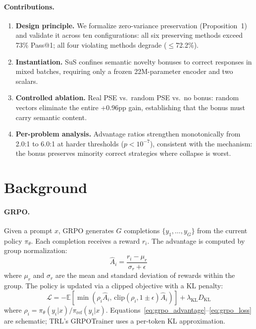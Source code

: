 \documentclass[10pt]{article}
\begin{document}
\paragraph{Contributions.}
\begin{enumerate}[leftmargin=*,noitemsep,topsep=2pt]
    \item \textbf{Design principle.} We formalize zero-variance preservation (Proposition~1) and validate it across ten configurations: all six preserving methods exceed 73\% Pass@1; all four violating methods degrade ($\leq$72.2\%).
    \item \textbf{Instantiation.} SuS confines semantic novelty bonuses to correct responses in mixed batches, requiring only a frozen 22M-parameter encoder and two scalars.
    \item \textbf{Controlled ablation.} Real PSE vs.\ random PSE vs.\ no bonus: random vectors eliminate the entire +0.96pp gain, establishing that the bonus must carry semantic content.
    \item \textbf{Per-problem analysis.} Advantage ratios strengthen monotonically from 2.0:1 to 6.0:1 at harder thresholds ($p < 10^{-7}$), consistent with the mechanism: the bonus preserves minority correct strategies where collapse is worst.
\end{enumerate}

\section{Background}
\label{sec:background}

\paragraph{GRPO.}
Given a prompt $x$, GRPO generates $G$ completions $\{y_1, \ldots, y_G\}$ from the current policy $\pi_\theta$. Each completion receives a reward $r_i$. The advantage is computed by group normalization:
\begin{equation}
    \hat{A}_i = \frac{r_i - \mu_r}{\sigma_r + \epsilon}
    \label{eq:grpo_advantage}
\end{equation}
where $\mu_r$ and $\sigma_r$ are the mean and standard deviation of rewards within the group. The policy is updated via a clipped objective with a KL penalty:
\begin{equation}
    \mathcal{L} = -\mathbb{E}\!\left[\min\!\left(\rho_i \hat{A}_i,\, \text{clip}(\rho_i, 1{\pm}\epsilon)\hat{A}_i\right)\right] + \lambda_{\text{KL}} D_{\text{KL}}
    \label{eq:grpo_loss}
\end{equation}
where $\rho_i = \pi_\theta(y_i|x) / \pi_{\text{ref}}(y_i|x)$. Equations~\ref{eq:grpo_advantage}--\ref{eq:grpo_loss} are schematic; TRL's GRPOTrainer uses a per-token KL approximation.
\end{document}
